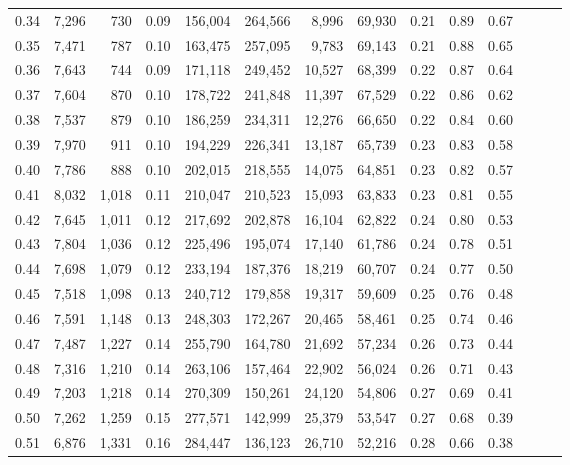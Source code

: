 \begin{tabular}{rrrrrrrrrrrrrr}
0.34 &   7,296 &    730 &  0.09 &  156,004 &  264,566 &   8,996 &  69,930 &  0.21 &  0.89 &      0.67 \\
0.35 &   7,471 &    787 &  0.10 &  163,475 &  257,095 &   9,783 &  69,143 &  0.21 &  0.88 &      0.65 \\
0.36 &   7,643 &    744 &  0.09 &  171,118 &  249,452 &  10,527 &  68,399 &  0.22 &  0.87 &      0.64 \\
0.37 &   7,604 &    870 &  0.10 &  178,722 &  241,848 &  11,397 &  67,529 &  0.22 &  0.86 &      0.62 \\
0.38 &   7,537 &    879 &  0.10 &  186,259 &  234,311 &  12,276 &  66,650 &  0.22 &  0.84 &      0.60 \\
0.39 &   7,970 &    911 &  0.10 &  194,229 &  226,341 &  13,187 &  65,739 &  0.23 &  0.83 &      0.58 \\
0.40 &   7,786 &    888 &  0.10 &  202,015 &  218,555 &  14,075 &  64,851 &  0.23 &  0.82 &      0.57 \\
0.41 &   8,032 &  1,018 &  0.11 &  210,047 &  210,523 &  15,093 &  63,833 &  0.23 &  0.81 &      0.55 \\
0.42 &   7,645 &  1,011 &  0.12 &  217,692 &  202,878 &  16,104 &  62,822 &  0.24 &  0.80 &      0.53 \\
0.43 &   7,804 &  1,036 &  0.12 &  225,496 &  195,074 &  17,140 &  61,786 &  0.24 &  0.78 &      0.51 \\
0.44 &   7,698 &  1,079 &  0.12 &  233,194 &  187,376 &  18,219 &  60,707 &  0.24 &  0.77 &      0.50 \\
0.45 &   7,518 &  1,098 &  0.13 &  240,712 &  179,858 &  19,317 &  59,609 &  0.25 &  0.76 &      0.48 \\
0.46 &   7,591 &  1,148 &  0.13 &  248,303 &  172,267 &  20,465 &  58,461 &  0.25 &  0.74 &      0.46 \\
0.47 &   7,487 &  1,227 &  0.14 &  255,790 &  164,780 &  21,692 &  57,234 &  0.26 &  0.73 &      0.44 \\
0.48 &   7,316 &  1,210 &  0.14 &  263,106 &  157,464 &  22,902 &  56,024 &  0.26 &  0.71 &      0.43 \\
0.49 &   7,203 &  1,218 &  0.14 &  270,309 &  150,261 &  24,120 &  54,806 &  0.27 &  0.69 &      0.41 \\
0.50 &   7,262 &  1,259 &  0.15 &  277,571 &  142,999 &  25,379 &  53,547 &  0.27 &  0.68 &      0.39 \\
0.51 &   6,876 &  1,331 &  0.16 &  284,447 &  136,123 &  26,710 &  52,216 &  0.28 &  0.66 &      0.38 \\

\end{tabular}
